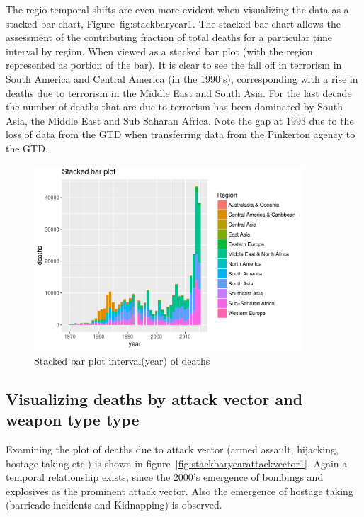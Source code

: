 The regio-temporal shifts are even more evident when visualizing the data as a stacked bar chart, Figure~{fig:stackbaryear1}. The stacked bar chart allows the assessment of the contributing fraction of total deaths for a particular time interval by region. When viewed as a stacked bar plot (with the region represented as portion of the bar). It is clear to see the fall off in terrorism in South America and Central America (in the 1990's), corresponding with a rise in deaths due to terrorism in the Middle East and South Asia. For the last decade the number of deaths that are due to terrorism has been dominated by South Asia, the Middle East and Sub Saharan Africa. Note the gap at 1993 due to the loss of data from the GTD when transferring data from the Pinkerton agency to the GTD.

\begin{figure}[t]
\includegraphics[width=10cm]{Peters_experiment_markdown_files/figure-latex/unnamed-chunk-6-1.pdf}
\caption{Stacked bar plot interval(year) of deaths}
\label{fig:stackbaryear1}
\centering
\end{figure}

\subsection{Visualizing deaths by attack vector and weapon type
type}\label{viewing-deaths-by-attack-vector-type}

Examining the plot of deaths due to attack vector (armed assault,
hijacking, hostage taking etc.) is shown in figure~\ref{fig:stackbaryearattackvector1}. Again a temporal relationship exists, since the 2000's emergence of bombings and explosives
as the prominent attack vector. Also the emergence of hostage taking
(barricade incidents and Kidnapping) is observed.

